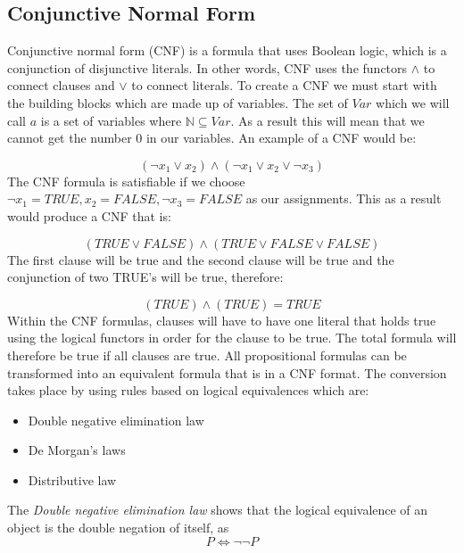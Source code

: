 \documentclass[11pt,a4paper]{article}
\begin{document}
\subsection{Conjunctive Normal Form}
Conjunctive normal form (CNF) is a formula that uses Boolean logic, which is a conjunction of disjunctive literals. In other words, CNF uses the functors $\land$ to connect clauses and $\lor$ to connect literals.
To create a CNF we must start with the building blocks which are made up of variables. The set of $Var$ which we will call $a$ is a set of variables where $\mathbb{N} \subseteq Var$. As a result this will mean that we cannot get the number $0$ in our variables.
An example of a CNF would be:

\begin{displaymath}
(\neg x _1 \lor x _2) \land (\neg x _1 \lor x _2 \lor \neg x _3)
\end{displaymath}
The CNF formula is satisfiable if we choose $\neg x_1 = TRUE, x _2 = FALSE, \neg x_3 = FALSE$ as our assignments. This as a result would produce a CNF that is: 

\begin{displaymath}
(TRUE \lor FALSE) \land (TRUE \lor FALSE \lor FALSE) 
\end{displaymath}
The first clause will be true and the second clause will be true and the conjunction of two TRUE's will be true, therefore: 

\begin{displaymath}
(TRUE) \land (TRUE) = TRUE
\end{displaymath}
Within the CNF formulas, clauses will have to have one literal that holds true using the logical functors in order for the clause to be true. The total formula will therefore be true if all clauses are true. 
All propositional formulas can be transformed into an equivalent formula that is in a CNF format. The conversion takes place by using rules based on logical equivalences which are:

\begin{itemize}
\item Double negative elimination law
\item De Morgan's laws
\item Distributive law
\end{itemize}


The \emph{Double negative elimination law} shows that the logical equivalence of an object is the double negation of itself, as
\begin{displaymath}
 P \Leftrightarrow \neg \neg P
\end{displaymath} 
\end{document}
